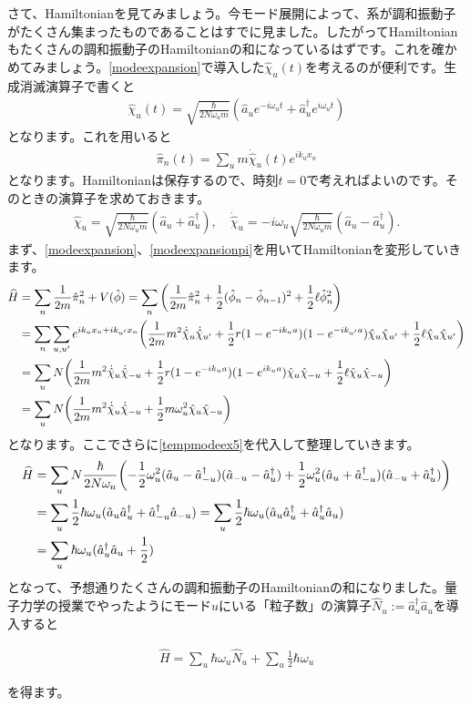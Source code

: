 \documentclass[report,paper=a4, fontsize=12pt, line_length=16cm, number_of_lines=33,dvipdfmx]{jlreq}
\newenvironment{important}{\begin{tcolorbox}[
  colback = white,
  colframe = red!35,
  boxrule = 2mm,
  fonttitle = \bfseries,
  after = \noindent] }{\end{tcolorbox}}
\numberwithin{equation}{chapter}
\newcommand{\phih}{\hat{\phi}}
\newcommand{\chih}{\hat{\chi}}
\newcommand{\pih}{\hat{\pi}}
\newcommand{\Hh}{\widehat{H}}
\newcommand{\ah}{\hat{a}}
\newcommand{\Nh}{\widehat{N}}
\begin{document}
さて、Hamiltonianを見てみましょう。今モード展開によって、系が調和振動子がたくさん集まったものであることはすでに見ました。したがってHamiltonianもたくさんの調和振動子のHamiltonianの和になっているはずです。これを確かめてみましょう。\eqref{modeexpansion}で導入した$\chih_u(t)$を考えるのが便利です。生成消滅演算子で書くと
\begin{align}
  \chih_u(t)=\sqrt{\frac{\hbar}{2N\omega_um}}(\ah_ue^{-i\omega_u t}
  +\ah_u^{\dag}e^{i\omega_u t})
\end{align}
となります。これを用いると
\begin{align}
  \pih_n(t)=\sum_{u}m\dot{\chih}_u(t)e^{ik_ux_n}\label{modeexpansionpi}
\end{align}
となります。Hamiltonianは保存するので、時刻$t=0$で考えればよいのです。そのときの演算子を求めておきます。
\begin{align}
  \chih_u=\sqrt{\frac{\hbar}{2N\omega_um}}(\ah_u
  +\ah_u^{\dag}),\quad
  \dot{\chih}_u=-i\omega_{u}\sqrt{\frac{\hbar}{2N\omega_um}}(\ah_u
  -\ah_u^{\dag}).\label{tempmodeex5}
\end{align}
まず、\eqref{modeexpansion}、\eqref{modeexpansionpi}を用いてHamiltonianを変形していきます。
\begin{align}
  \Hh&=\sum_{n}\frac{1}{2m}\pih_n^2+V(\phih)
  =\sum_{n}\qty(
    \frac{1}{2m}\pih_n^2+\frac12(\phih_n-\phih_{n-1})^2
    +\frac12\ell \phih_n^2
  )\nonumber\\
  &=\sum_n\sum_{u,u'}e^{ik_ux_n+ik_{u'}x_n}\qty(
    \frac{1}{2m}m^2\dot{\chih}_u\dot{\chih}_{u'}
    +\frac12 r (1-e^{-ik_ua})(1-e^{-ik_{u'}a})\chih_u\chih_{u'}
    +\frac12\ell \chih_u\chih_{u'}
  )\nonumber\\
  &=\sum_{u}N\qty(
    \frac{1}{2m}m^2\dot{\chih}_u\dot{\chih}_{-u}
    +\frac12 r (1-e^{-ik_ua})(1-e^{ik_{u}a})\chih_u\chih_{-u}
    +\frac12\ell \chih_u\chih_{-u}
  )\nonumber\\
  &=\sum_{u}N\qty(
    \frac{1}{2m}m^2\dot{\chih}_u\dot{\chih}_{-u}
    +\frac12 m\omega_{u}^2 \chih_u\chih_{-u}
  )
\end{align}
となります。ここでさらに\eqref{tempmodeex5}を代入して整理していきます。
\begin{align}
  \Hh
  &=\sum_{u}N\frac{\hbar}{2N\omega_{u}}\qty(
    -\frac12 \omega_{u}^2(\ah_u-\ah_{-u}^{\dag})(\ah_{-u}-\ah_{u}^{\dag})
    +\frac12 \omega_{u}^2(\ah_u+\ah_{-u}^{\dag})(\ah_{-u}+\ah_{u}^{\dag})
  )\nonumber\\
  &=\sum_{u}\frac12 \hbar\omega_{u}(\ah_{u}\ah_{u}^{\dag}+\ah_{-u}^{\dag}\ah_{-u})=\sum_{u}\frac12 \hbar\omega_{u}(\ah_{u}\ah_{u}^{\dag}+\ah_{u}^{\dag}\ah_{u})\nonumber\\
  &=\sum_{u}\hbar\omega_{u}(\ah_{u}^{\dag}\ah_{u}+\frac12)
\end{align}
となって、予想通りたくさんの調和振動子のHamiltonianの和になりました。量子力学の授業でやったようにモード$u$にいる「粒子数」の演算子$\Nh_u:=\ah_u^{\dag}\ah_u$を導入すると
\begin{important}
\begin{align}
    \Hh = \sum_{u}\hbar
    \omega_{u}\Nh_{u}
    +\sum_{u}\frac12 \hbar\omega_{u}\label{oscillatorhamiltonian}
\end{align}
\end{important}
を得ます。
\end{document}
